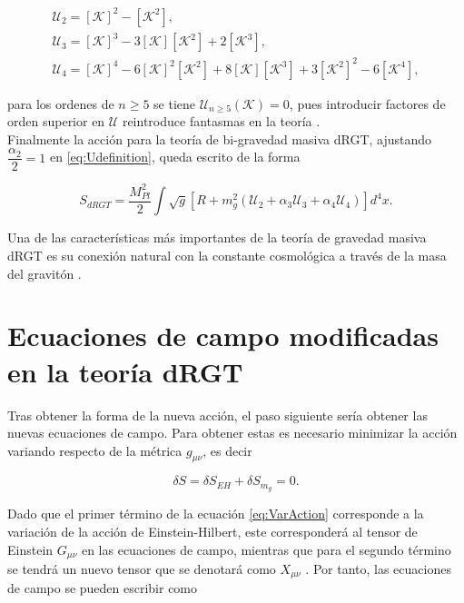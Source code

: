 \begin{gather}
    \label{eq:U2}
        \mathcal{U}_2=[\mathcal{K}]^2-[\mathcal{K}^2],\\
        \mathcal{U}_3=[\mathcal{K}]^3-3[\mathcal{K}][\mathcal{K}^2]+2[\mathcal{K}^3] \label{eq:U3},
        \\
        \mathcal{U}_4=[\mathcal{K}]^4-6[\mathcal{K}]^2[\mathcal{K}^2]+8[\mathcal{K}][\mathcal{K}^3]+3[\mathcal{K}^2]^2-6[\mathcal{K}^4],
\end{gather}

para los ordenes de $n\geq  5$ se tiene  $\mathcal{U}_{n\geq 5}(\mathcal{K})=0$, pues introducir factores de orden superior en $\mathcal{U}$ reintroduce fantasmas en la teoría \cite{StabilityOfSdSBlackHoles}.\\

Finalmente la acción para la teoría de bi-gravedad masiva dRGT, ajustando $\dfrac{\alpha_2}{2}=1$ en \eqref{eq:Udefinition}, queda escrito de la forma

\begin{equation}
    S_{dRGT}=\dfrac{M^2_{Pl}}{2}\int \sqrt{g}\left[R+m_g^2\left(\mathcal{U}_2+\alpha_3\mathcal{U}_3+\alpha_4\mathcal{U}_4\right)\right] d^4x.
    \label{eq:AcciondRGT}
\end{equation}

Una de las características más importantes de la teoría de gravedad masiva dRGT es su conexión natural con la constante cosmológica a través de la masa del gravitón \cite{TheoreticalAspectsOfMassiveGRavity}.

\section{Ecuaciones de campo modificadas en la teoría dRGT}

Tras obtener la forma de la nueva acción, el paso siguiente sería obtener las nuevas ecuaciones de campo. Para obtener estas es necesario minimizar la acción variando respecto de la métrica $g_{\mu\nu}$, es decir

\begin{equation}
    \delta S=\delta S_{EH}+\delta S_{m_g}=0.
    \label{eq:VarAction}
\end{equation}

Dado que el primer término de la ecuación \eqref{eq:VarAction} corresponde a la variación de la acción de Einstein-Hilbert, este corresponderá al tensor de Einstein $G_{\mu\nu}$ en las ecuaciones de campo, mientras que para el segundo término se tendrá un nuevo tensor que se denotará como $X_{\mu\nu}$ \cite{ConsistentMassiveGraviton}. Por tanto, las ecuaciones de campo se pueden escribir como 

